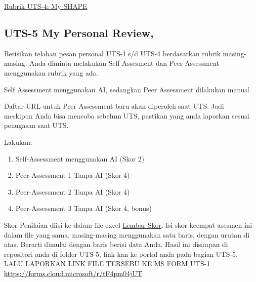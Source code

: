 \documentclass[
  letterpaper,
  DIV=11,
  numbers=noendperiod]{scrreprt}
\providecommand{\tightlist}{%
  \setlength{\itemsep}{0pt}\setlength{\parskip}{0pt}}
\begin{document}
\href{./asesmen/Rubrik_II-2100_CSV/UTS-4.csv}{Rubrik UTS-4: My SHAPE}

\subsection*{UTS-5 My Personal Review,}\label{uts-5-my-personal-review}

Berisikan telahan pesan personal UTS-1 s/d UTS-4 berdasarkan rubrik
masing-masing. Anda diminta melakukan Self Assesment dan Peer Assessment
menggunakan rubrik yang ada.

Self Assessment menggunakan AI, sedangkan Peer Assessment dilakukan
manual

\begin{tcolorbox}[enhanced jigsaw, opacityback=0, bottomrule=.15mm, arc=.35mm, toptitle=1mm, title=\textcolor{quarto-callout-warning-color}{\faExclamationTriangle}\hspace{0.5em}{Penugasan Peer Assignmen Baru Ada Nanti Saat UTS}, colframe=quarto-callout-warning-color-frame, breakable, colbacktitle=quarto-callout-warning-color!10!white, bottomtitle=1mm, opacitybacktitle=0.6, colback=white, coltitle=black, titlerule=0mm, toprule=.15mm, rightrule=.15mm, leftrule=.75mm, left=2mm]

Daftar URL untuk Peer Assessment baru akan diperoleh saat UTS. Jadi
meskipun Anda bisa mencoba sebelum UTS, pastikan yang anda laporkan
sesuai penugasan saat UTS.

\end{tcolorbox}

Lakukan:

\begin{enumerate}
\def\labelenumi{\arabic{enumi}.}
\tightlist
\item
  Self-Assessment menggunakan AI (Skor 2)
\item
  Peer-Assessment 1 Tanpa AI (Skor 4)
\item
  Peer-Assessment 2 Tanpa AI (Skor 4)
\item
  Peer-Assessment 3 Tanpa AI (Skor 4, bonus)
\end{enumerate}

Skor Penilaian diisi ke dalam file excel
\href{./asesmen/UTS-5_Skor.xlsx}{Lembar Skor}. Isi skor keempat asesmen
ini dalam file yang sama, masing-masing menggunakan satu baris, dengan
urutan di atas. Berarti dimulai dengan baris berisi data Anda. Hasil ini
disimpan di repositori anda di folder UTS-5, link kan ke portal anda
pada bagian UTS-5, LALU LAPORKAN LINK FILE TERSEBU KE MS FORM UTS-1
\url{https://forms.cloud.microsoft/r/tF4pm04jUT}
\end{document}
